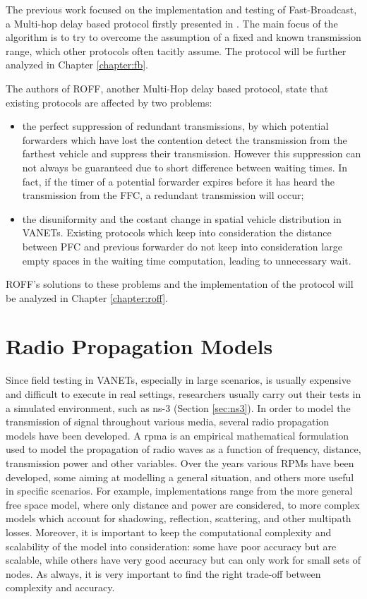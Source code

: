 				
					The previous work\cite{ROM2017} focused on the implementation and testing of Fast-Broadcast, a Multi-hop delay based protocol firstly presented in \cite{4199282}. The main focus of the algorithm is to try to overcome the assumption of a fixed and known transmission range, which other protocols often tacitly assume. The protocol will be further analyzed in Chapter \ref{chapter:fb}.
					
					The authors of ROFF\cite{6906275}, another Multi-Hop delay based protocol, state that existing protocols are affected by two problems:
					\begin{itemize}
						\item the perfect suppression of redundant transmissions, by which potential forwarders which have lost the contention detect the transmission from the farthest vehicle and suppress their transmission. However this suppression can not always be guaranteed due to short difference between waiting times. In fact, if the timer of a potential forwarder expires before it has heard the transmission from the FFC, a redundant transmission will occur;
						\item the disuniformity and the costant change in spatial vehicle distribution in VANETs. Existing protocols which keep into consideration the distance between PFC and previous forwarder do not keep into consideration large empty spaces in the waiting time computation, leading to unnecessary wait.
					\end{itemize}
					ROFF's solutions to these problems and the implementation of the protocol will be analyzed in Chapter \ref{chapter:roff}.
	
		\section{Radio Propagation Models}
			\label{sec:rpm}
			Since field testing in VANETs, especially in large scenarios, is usually expensive and difficult to execute in real settings, researchers usually carry out their tests in a simulated environment, such as ns-3 (Section \ref{sec:ns3}). In order to model the transmission of signal throughout various media, several radio propagation models have been developed.
			A \gls{rpma} is an empirical mathematical formulation used to model the propagation of radio waves as a function of frequency, distance, transmission power and other variables. Over the years various RPMs have been developed, some aiming at modelling a general situation, and others more useful in specific scenarios. For example, implementations range from the more general free space model, where only distance and power are considered, to more complex models which account for shadowing, reflection, scattering, and other multipath losses. Moreover, it is important to keep the computational complexity and scalability of the model into consideration: some have poor accuracy but are scalable, while others have very good accuracy but can only work for small sets of nodes. As always, it is very important to find the right trade-off between complexity and accuracy.
			
